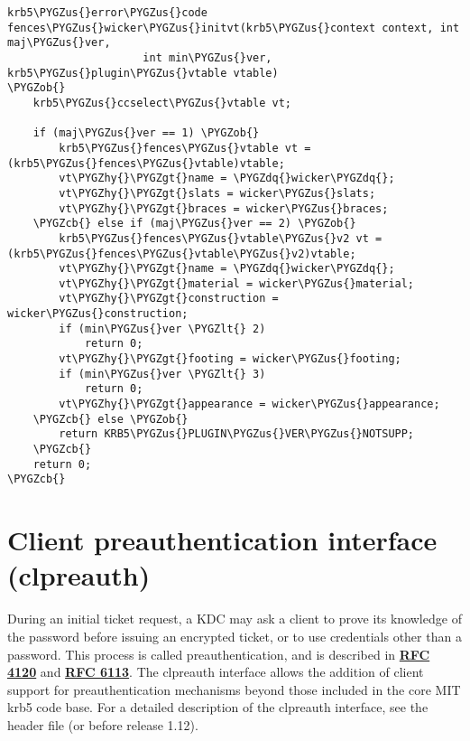 \documentclass[letterpaper,10pt,english]{sphinxmanual}
\def\PYGZus{\char`\_}
\def\PYGZob{\char`\{}
\def\PYGZcb{\char`\}}
\def\PYGZlt{\char`\<}
\def\PYGZgt{\char`\>}
\def\PYGZhy{\char`\-}
\def\PYGZdq{\char`\"}
\begin{document}
\begin{Verbatim}[commandchars=\\\{\}]
krb5\PYGZus{}error\PYGZus{}code
fences\PYGZus{}wicker\PYGZus{}initvt(krb5\PYGZus{}context context, int maj\PYGZus{}ver,
                     int min\PYGZus{}ver, krb5\PYGZus{}plugin\PYGZus{}vtable vtable)
\PYGZob{}
    krb5\PYGZus{}ccselect\PYGZus{}vtable vt;

    if (maj\PYGZus{}ver == 1) \PYGZob{}
        krb5\PYGZus{}fences\PYGZus{}vtable vt = (krb5\PYGZus{}fences\PYGZus{}vtable)vtable;
        vt\PYGZhy{}\PYGZgt{}name = \PYGZdq{}wicker\PYGZdq{};
        vt\PYGZhy{}\PYGZgt{}slats = wicker\PYGZus{}slats;
        vt\PYGZhy{}\PYGZgt{}braces = wicker\PYGZus{}braces;
    \PYGZcb{} else if (maj\PYGZus{}ver == 2) \PYGZob{}
        krb5\PYGZus{}fences\PYGZus{}vtable\PYGZus{}v2 vt = (krb5\PYGZus{}fences\PYGZus{}vtable\PYGZus{}v2)vtable;
        vt\PYGZhy{}\PYGZgt{}name = \PYGZdq{}wicker\PYGZdq{};
        vt\PYGZhy{}\PYGZgt{}material = wicker\PYGZus{}material;
        vt\PYGZhy{}\PYGZgt{}construction = wicker\PYGZus{}construction;
        if (min\PYGZus{}ver \PYGZlt{} 2)
            return 0;
        vt\PYGZhy{}\PYGZgt{}footing = wicker\PYGZus{}footing;
        if (min\PYGZus{}ver \PYGZlt{} 3)
            return 0;
        vt\PYGZhy{}\PYGZgt{}appearance = wicker\PYGZus{}appearance;
    \PYGZcb{} else \PYGZob{}
        return KRB5\PYGZus{}PLUGIN\PYGZus{}VER\PYGZus{}NOTSUPP;
    \PYGZcb{}
    return 0;
\PYGZcb{}
\end{Verbatim}


\section{Client preauthentication interface (clpreauth)}
\label{plugindev/clpreauth:client-preauthentication-interface-clpreauth}\label{plugindev/clpreauth::doc}
During an initial ticket request, a KDC may ask a client to prove its
knowledge of the password before issuing an encrypted ticket, or to
use credentials other than a password.  This process is called
preauthentication, and is described in \href{http://tools.ietf.org/html/rfc4120.html}{\textbf{RFC 4120}} and \href{http://tools.ietf.org/html/rfc6113.html}{\textbf{RFC 6113}}.
The clpreauth interface allows the addition of client support for
preauthentication mechanisms beyond those included in the core MIT
krb5 code base.  For a detailed description of the clpreauth
interface, see the header file  (or
 before release 1.12).
\end{document}
